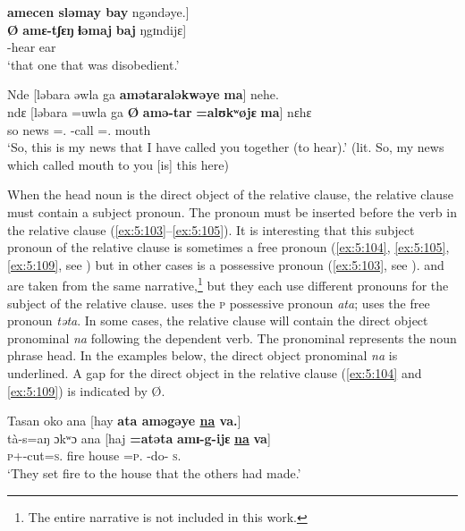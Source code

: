 \medskip
\textbf{amecen  sləmay  bay}  ngəndəye.]  \\
\gll  \textbf{Ø}   \textbf{amɛ-tʃɛŋ}     \textbf{ɬəmaj}  \textbf{baj}      ŋgɪndijɛ]\\
      { } {\DEP}-hear   ear       {\NEG}     {\DEM}\\
\glt  ‘that one that was disobedient.’\\
\z

\ea \label{ex:5:102}
Nde  [ləbara  əwla  ga \textbf{amətaraləkwəye}  \textbf{ma}]  nehe.\\
\gll  ndɛ  [ləbara  =uwla    ga  \textbf{Ø} \textbf{amə-tar}  \textbf{=alʊkʷøjɛ}  \textbf{ma}]  nɛhɛ\\
      so  news  ={\oneS}.{\POSS}  {\ADJ}  { }    {\DEP}-call ={\twoP}.{\IO}    mouth  {\DEM}\\
\glt  ‘So, this is my news that I have called you together (to hear).’ (lit. So, my news which called mouth to you [is] this here)
\z

When the head noun is the direct object of the relative clause, the relative clause must contain a subject pronoun. The pronoun  must be inserted before the verb in the relative clause (\ref{ex:5:103}--\ref{ex:5:105}). It is interesting that this subject pronoun of the relative clause is sometimes a free pronoun (\ref{ex:5:104}, \ref{ex:5:105}, \ref{ex:5:109}, see ) but in other cases is a possessive pronoun (\ref{ex:5:103}, see ).   and  are taken from the same narrative,\footnote{The entire narrative is not included in this work.} but they each use different pronouns for the subject of the relative clause.  uses the \textsc{p} possessive pronoun \textit{ata};  uses the free pronoun \textit{təta}. In some cases, the relative clause will contain the direct object pronominal \textit{na} following the dependent verb. The \DO pronominal represents the noun phrase head. In the examples below, the direct object pronominal \textit{na} is underlined. A gap for the direct object in the relative clause (\ref{ex:5:104} and \ref{ex:5:109}) is indicated by {Ø}.  

\ea \label{ex:5:103}
Tasan  oko  ana  [hay  \textbf{ata  aməgəye \underline{na} va.}]\\
\gll  tà-s=aŋ            ɔkʷɔ   ana    [haj  \textbf{=atəta}     \textbf{amɪ-g-ijɛ} \textbf{\underline{na}} \textbf{va}]\\
      \textsc{p}+{\PFV}-cut=\textsc{s}.{\IO}  fire   {\DAT}   house  =\textsc{p}.{\POSS}   {\DEP}-do-{\CL}      \textsc{s}.{\DO}    {\PRF}\\
\glt  ‘They set fire to the house that the others had made.’
\z

